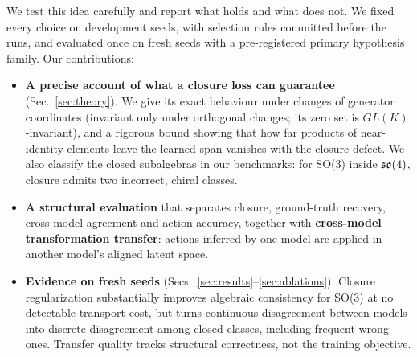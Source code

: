 We test this idea carefully and report what holds and what does not. We fixed every choice on development seeds,
with selection rules committed before the runs, and evaluated once on fresh seeds with a pre-registered primary
hypothesis family. Our contributions:
\begin{itemize}
\item \textbf{A precise account of what a closure loss can guarantee} (Sec.~\ref{sec:theory}). We give its exact
behaviour under changes of generator coordinates (invariant only under orthogonal changes; its zero set is
$GL(K)$-invariant), and a rigorous bound showing that how far products of near-identity elements leave the learned
span vanishes with the closure defect. We also classify the closed subalgebras in our benchmarks: for SO(3) inside
$\mathfrak{so}(4)$, closure admits two incorrect, chiral classes.
\item \textbf{A structural evaluation} that separates closure, ground-truth recovery, cross-model agreement and
action accuracy, together with \textbf{cross-model transformation transfer}: actions inferred by one model are
applied in another model's aligned latent space.
\item \textbf{Evidence on \NNseeds{} fresh seeds} (Secs.~\ref{sec:results}--\ref{sec:ablations}). Closure
regularization substantially improves algebraic consistency for SO(3) at no detectable transport cost, but turns
continuous disagreement between models into discrete disagreement among closed classes, including frequent wrong
ones. Transfer quality tracks structural correctness, not the training objective.
\end{itemize}

